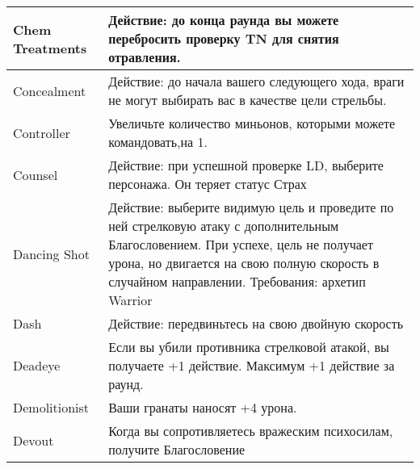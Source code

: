\begin{table}[h]
\begin{tabularx}{\textwidth}{|l|X|}
    Chem Treatments    & Действие: до конца раунда вы можете перебросить проверку TN для снятия отравления.                                                                                                                                                 \\ \hline
    Concealment        & Действие: до начала вашего следующего хода, враги не могут выбирать вас в качестве цели стрельбы.                                                                                                                                  \\ \hline
    Controller         & Увеличьте количество миньонов, которыми можете командовать,на 1.                                                                                                                                                                   \\ \hline
    Counsel            & Действие: при успешной проверке LD, выберите персонажа. Он теряет статус Страх                                                                                                                                                     \\ \hline
    Dancing Shot       & Действие: выберите видимую цель и проведите по ней стрелковую атаку с дополнительным Благословением. При успехе, цель не получает урона, но двигается на свою полную скорость в случайном направлении. Требования: архетип Warrior \\ \hline
    Dash               & Действие: передвиньтесь на свою двойную скорость                                                                                                                                                                                   \\ \hline
    Deadeye            & Если вы убили противника стрелковой атакой, вы получаете +1 действие. Максимум +1 действие за раунд.                                                                                                                               \\ \hline
    Demolitionist      & Ваши гранаты наносят +4 урона.                                                                                                                                                                                                     \\ \hline
    Devout             & Когда вы сопротивляетесь вражеским психосилам, получите Благословение                                                                                                                                                              \\ \hline

\end{tabularx}
\end{table}
